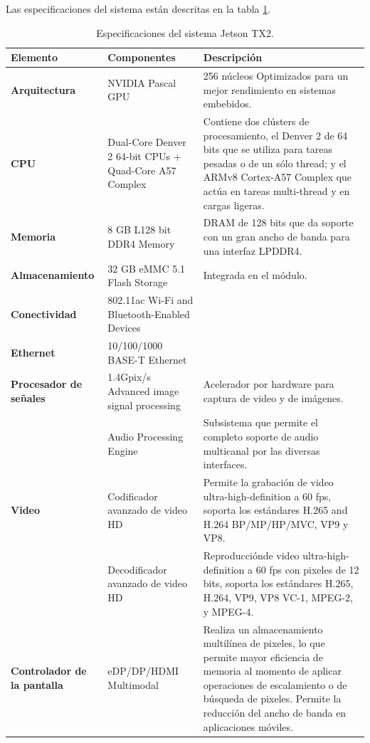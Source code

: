     Las especificaciones del sistema están descritas en la tabla \ref{tab:table1}.
    
    \begin{table}[h!]
      \begin{center}
            \scriptsize
        \begin{tabular}{|m{2.5cm}|m{6cm}|m{6.5cm}|}
         \hline
        \cellcolor{lightgray}\textbf{Elemento} & \cellcolor{lightgray} \textbf{Componentes} & \cellcolor{lightgray} \textbf{Descripción}\\ 
         \hline
         \textbf{Arquitectura} & NVIDIA Pascal GPU & 256 núcleos Optimizados para un mejor rendimiento en sistemas embebidos.\\
         \hline
         \textbf{CPU} & Dual-Core Denver 2 64-bit CPUs + Quad-Core A57 Complex & Contiene dos clústers de procesamiento, el Denver 2 de 64 bits que se utiliza para tareas pesadas o de un sólo thread; y el ARMv8 Cortex-A57 Complex que actúa en tareas multi-thread y en cargas ligeras.\\
         \hline
         \textbf{Memoria} & 8 GB L128 bit DDR4 Memory & DRAM de 128 bits que da soporte con un gran ancho de banda para una interfaz LPDDR4.  \\
          \hline
    	\textbf{Almacenamiento} & 32 GB eMMC 5.1 Flash Storage & Integrada en el módulo.\\
         \hline
    	\textbf{Conectividad} & 802.11ac Wi-Fi and Bluetooth-Enabled Devices & \\
         \hline
   	 \textbf{Ethernet} &10/100/1000 BASE-T Ethernet & \\
	  \hline
   	 \textbf{Procesador de señales} &1.4Gpix/s Advanced image signal processing & Acelerador por hardware para captura de video y de imágenes.\\
	 &Audio Processing Engine & Subsistema que permite el completo soporte de audio multicanal por las diversas interfaces.\\
	 \hline
   	 \textbf{Video} & Codificador avanzado de video HD & Permite la grabación de video ultra-high-definition a 60 fps, soporta los estándares H.265 and H.264 BP/MP/HP/MVC, VP9 y VP8. \\
	  & Decodificador avanzado de video HD & Reproducciónde video ultra-high-definition a 60 fps con pixeles de 12 bits, soporta los estándares H.265, H.264, VP9, VP8 VC-1, MPEG-2, y MPEG-4. \\
         \hline
   	 \textbf{Controlador de la pantalla} &eDP/DP/HDMI Multimodal & Realiza un almacenamiento multilínea de pixeles, lo que permite mayor eficiencia de memoria al momento de aplicar operaciones de escalamiento o de búsqueda de pixeles. Permite la reducción del ancho de banda en aplicaciones móviles.\\
         \hline
        \end{tabular}
        \caption{Especificaciones del sistema Jetson TX2\cite{jtx2dk}.}
        \label{tab:table1}
      \end{center}
    \end{table}
   
